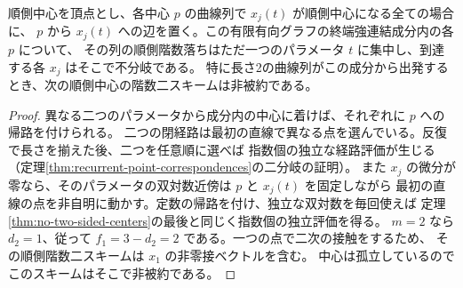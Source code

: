 \begin{proposition}\label{prop:terminal-branch-contact}
順側中心を頂点とし、各中心 $p$ の曲線列で $x_j(t)$ が順側中心になる全ての場合に、
$p$ から $x_j(t)$ への辺を置く。この有限有向グラフの終端強連結成分内の各 $p$ について、
その列の順側階数落ちはただ一つのパラメータ $t$ に集中し、到達する各 $x_j$ はそこで不分岐である。
特に長さ2の曲線列がこの成分から出発するとき、次の順側中心の階数二スキームは非被約である。
\end{proposition}
\begin{proof}
異なる二つのパラメータから成分内の中心に着けば、それぞれに $p$ への帰路を付けられる。
二つの閉経路は最初の直線で異なる点を選んでいる。反復で長さを揃えた後、二つを任意順に選べば
指数個の独立な経路評価が生じる（定理\ref{thm:recurrent-point-correspondences}の二分岐の証明）。
また $x_j$ の微分が零なら、そのパラメータの双対数近傍は $p$ と $x_j(t)$ を固定しながら
最初の直線の点を非自明に動かす。定数の帰路を付け、独立な双対数を毎回使えば
定理\ref{thm:no-two-sided-centers}の最後と同じく指数個の独立評価を得る。
$m=2$ なら $d_2=1$、従って $f_1=3-d_2=2$ である。一つの点で二次の接触をするため、
その順側階数二スキームは $x_1$ の非零接ベクトルを含む。
中心は孤立しているのでこのスキームはそこで非被約である。
\end{proof}
